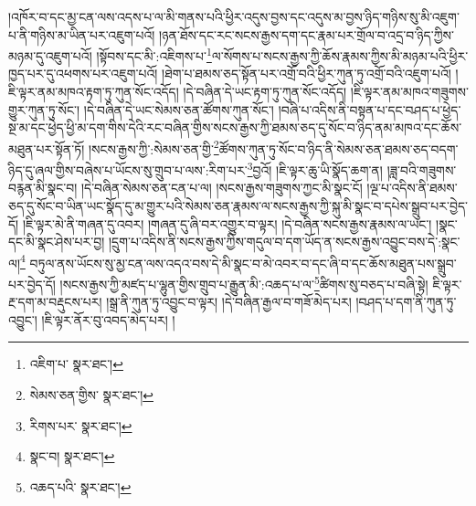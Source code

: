 །འཁོར་བ་དང་མྱ་ངན་ལས་འདས་པ་ལ་མི་གནས་པའི་ཕྱིར་འདུས་བྱས་དང་འདུས་མ་བྱས་ཉིད་གཉིས་སུ་མི་འཇུག་པ་ནི་གཉིས་མ་ཡིན་པར་འཇུག་པའོ། །ཉན་ཐོས་དང་རང་སངས་རྒྱས་དག་དང་རྣམ་པར་གྲོལ་བ་འདྲ་བ་ཉིད་ཀྱིས་མཉམ་དུ་འཇུག་པའོ། །སྟོབས་དང་མི་:འཇིགས་པ་\footnote{འཇིག་པ་  སྣར་ཐང་། }ལ་སོགས་པ་སངས་རྒྱས་ཀྱི་ཆོས་རྣམས་ཀྱིས་མི་མཉམ་པའི་ཕྱིར་ཁྱད་པར་དུ་འཕགས་པར་འཇུག་པའོ། །ཐེག་པ་ཐམས་ཅད་སྟོན་པར་འགྲོ་བའི་ཕྱིར་ཀུན་ཏུ་འགྲོ་བའི་འཇུག་པའོ། །ཇི་ལྟར་ནམ་མཁའ་རྟག་ཏུ་ཀུན་སོང་འདོད། །དེ་བཞིན་དེ་ཡང་རྟག་ཏུ་ཀུན་སོང་འདོད། །ཇི་ལྟར་ནམ་མཁའ་གཟུགས་གྱུར་ཀུན་ཏུ་སོང་། །དེ་བཞིན་དེ་ཡང་སེམས་ཅན་ཚོགས་ཀུན་སོང་། །བཞི་པ་འདིས་ནི་བསྟན་པ་དང་བཤད་པ་ཕྱེད་སྔ་མ་དང་ཕྱེད་ཕྱི་མ་དག་གིས་དེའི་རང་བཞིན་གྱིས་སངས་རྒྱས་ཀྱི་ཐམས་ཅད་དུ་སོང་བ་ཉིད་ནམ་མཁའ་དང་ཆོས་མཐུན་པར་སྟོན་ཏོ། །སངས་རྒྱས་ཀྱི་:སེམས་ཅན་གྱི་\footnote{སེམས་ཅན་གྱིས་  སྣར་ཐང་། }ཚོགས་ཀུན་ཏུ་སོང་བ་ཉིད་ནི་སེམས་ཅན་ཐམས་ཅད་བདག་ཉིད་དུ་ཞལ་གྱིས་བཞེས་པ་ཡོངས་སུ་གྲུབ་པ་ལས་:རིག་པར་\footnote{རིགས་པར་  སྣར་ཐང་། }བྱའོ། །ཇི་ལྟར་ཆུ་ཡི་སྣོད་ཆག་ན། །ཟླ་བའི་གཟུགས་བརྙན་མི་སྣང་བ། །དེ་བཞིན་སེམས་ཅན་ངན་པ་ལ། །སངས་རྒྱས་གཟུགས་ཀྱང་མི་སྣང་ངོ། །ལྔ་པ་འདིས་ནི་ཐམས་ཅད་དུ་སོང་བ་ཡིན་ཡང་སྣོད་དུ་མ་གྱུར་པའི་སེམས་ཅན་རྣམས་ལ་སངས་རྒྱས་ཀྱི་སྐུ་མི་སྣང་བ་དཔེས་སྒྲུབ་པར་བྱེད་དོ། །ཇི་ལྟར་མེ་ནི་གཞན་དུ་འབར། །གཞན་དུ་ཞི་བར་འགྱུར་བ་ལྟར། །དེ་བཞིན་སངས་རྒྱས་རྣམས་ལ་ཡང་། །སྣང་དང་མི་སྣང་ཤེས་པར་བྱ། །དྲུག་པ་འདིས་ནི་སངས་རྒྱས་ཀྱིས་གདུལ་བ་དག་ཡོད་ན་སངས་རྒྱས་འབྱུང་བས་དེ་:སྣང་ལ།\footnote{སྣང་བ།  སྣར་ཐང་། } བཏུལ་ནས་ཡོངས་སུ་མྱ་ངན་ལས་འདའ་བས་དེ་མི་སྣང་བ་མེ་འབར་བ་དང་ཞི་བ་དང་ཆོས་མཐུན་པས་སྒྲུབ་པར་བྱེད་དོ། །སངས་རྒྱས་ཀྱི་མཛད་པ་ལྷུན་གྱིས་གྲུབ་པ་རྒྱུན་མི་:འཆད་པ་ལ་\footnote{འཆད་པའི་  སྣར་ཐང་། }ཚིགས་སུ་བཅད་པ་བཞི་སྟེ། ཇི་ལྟར་རྔ་དག་མ་བརྡུངས་པར། །སྒྲ་ནི་ཀུན་ཏུ་འབྱུང་བ་ལྟར། །དེ་བཞིན་རྒྱལ་བ་གཟོ་མེད་པར། །བཤད་པ་དག་ནི་ཀུན་ཏུ་འབྱུང་། །ཇི་ལྟར་ནོར་བུ་འབད་མེད་པར། །
